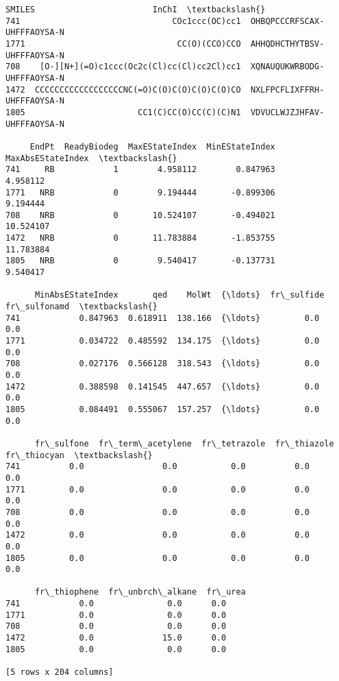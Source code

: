 \documentclass[11pt]{article}
\newcommand{\prompt}[4]{
        \llap{{\color{#2}[#3]: #4}}\vspace{-1.25em}
    }
\begin{document}
            \begin{tcolorbox}[breakable, boxrule=.5pt, size=fbox, pad at break*=1mm, opacityfill=0]
\prompt{Out}{outcolor}{5}{\hspace{3.5pt}}
\begin{Verbatim}[commandchars=\\\{\}]
                                          SMILES                        InChI  \textbackslash{}
741                               COc1ccc(OC)cc1  OHBQPCCCRFSCAX-UHFFFAOYSA-N
1771                               CC(O)(CCO)CCO  AHHQDHCTHYTBSV-UHFFFAOYSA-N
708    [O-][N+](=O)c1ccc(Oc2c(Cl)cc(Cl)cc2Cl)cc1  XQNAUQUKWRBODG-UHFFFAOYSA-N
1472  CCCCCCCCCCCCCCCCCCNC(=O)C(O)C(O)C(O)C(O)CO  NXLFPCFLIXFFRH-UHFFFAOYSA-N
1805                       CC1(C)CC(O)CC(C)(C)N1  VDVUCLWJZJHFAV-UHFFFAOYSA-N

     EndPt  ReadyBiodeg  MaxEStateIndex  MinEStateIndex  MaxAbsEStateIndex  \textbackslash{}
741     RB            1        4.958112        0.847963           4.958112
1771   NRB            0        9.194444       -0.899306           9.194444
708    NRB            0       10.524107       -0.494021          10.524107
1472   NRB            0       11.783884       -1.853755          11.783884
1805   NRB            0        9.540417       -0.137731           9.540417

      MinAbsEStateIndex       qed    MolWt  {\ldots}  fr\_sulfide  fr\_sulfonamd  \textbackslash{}
741            0.847963  0.618911  138.166  {\ldots}         0.0           0.0
1771           0.034722  0.485592  134.175  {\ldots}         0.0           0.0
708            0.027176  0.566128  318.543  {\ldots}         0.0           0.0
1472           0.388598  0.141545  447.657  {\ldots}         0.0           0.0
1805           0.084491  0.555067  157.257  {\ldots}         0.0           0.0

      fr\_sulfone  fr\_term\_acetylene  fr\_tetrazole  fr\_thiazole  fr\_thiocyan  \textbackslash{}
741          0.0                0.0           0.0          0.0          0.0
1771         0.0                0.0           0.0          0.0          0.0
708          0.0                0.0           0.0          0.0          0.0
1472         0.0                0.0           0.0          0.0          0.0
1805         0.0                0.0           0.0          0.0          0.0

      fr\_thiophene  fr\_unbrch\_alkane  fr\_urea
741            0.0               0.0      0.0
1771           0.0               0.0      0.0
708            0.0               0.0      0.0
1472           0.0              15.0      0.0
1805           0.0               0.0      0.0

[5 rows x 204 columns]
\end{Verbatim}
\end{tcolorbox}
        
\end{document}
